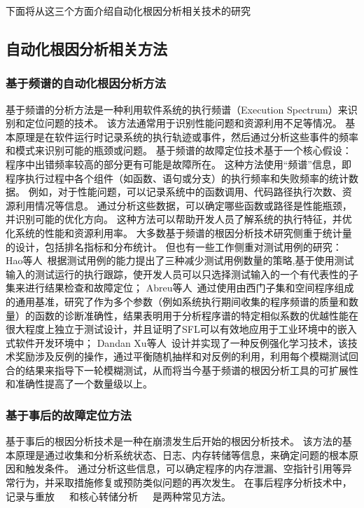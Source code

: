 下面将从这三个方面介绍自动化根因分析相关技术的研究
\subsection{自动化根因分析相关方法}
\subsubsection{基于频谱的自动化根因分析方法}
基于频谱的分析方法是一种利用软件系统的执行频谱（Execution Spectrum）来识别和定位问题的技术。
该方法通常用于识别性能问题和资源利用不足等情况。
基本原理是在软件运行时记录系统的执行轨迹或事件，然后通过分析这些事件的频率和模式来识别可能的瓶颈或问题。
基于频谱的故障定位技术基于一个核心假设：程序中出错频率较高的部分更有可能是故障所在。
这种方法使用“频谱”信息，即程序执行过程中各个组件（如函数、语句或分支）的执行频率和失败频率的统计数据。
例如，对于性能问题，可以记录系统中的函数调用、代码路径执行次数、资源利用情况等信息。
通过分析这些数据，可以确定哪些函数或路径是性能瓶颈，并识别可能的优化方向。
这种方法可以帮助开发人员了解系统的执行特征，并优化系统的性能和资源利用率。
大多数基于频谱的根因分析技术研究侧重于统计量的设计，包括排名指标和分布统计。
但也有一些工作侧重对测试用例的研究：
Hao等人~\cite{Test2010}根据测试用例的能力提出了三种减少测试用例数量的策略,基于使用测试输入的测试运行的执行跟踪，使开发人员可以只选择测试输入的一个有代表性的子集来进行结果检查和故障定位；
Abreu等人~\cite{practical2009}通过使用由西门子集和空间程序组成的通用基准，研究了作为多个参数（例如系统执行期间收集的程序频谱的质量和数量）的函数的诊断准确性，结果表明用于分析程序谱的特定相似系数的优越性能在很大程度上独立于测试设计，并且证明了SFL可以有效地应用于工业环境中的嵌入式软件开发环境中；
Dandan Xu等人~\cite{Racing}设计并实现了一种反例强化学习技术，该技术奖励涉及反例的操作，通过平衡随机抽样和对反例的利用，利用每个模糊测试回合的结果来指导下一轮模糊测试，从而将当今基于频谱的根因分析工具的可扩展性和准确性提高了一个数量级以上。

\subsubsection{基于事后的故障定位方法}
基于事后的根因分析技术是一种在崩溃发生后开始的根因分析技术。
该方法的基本原理是通过收集和分析系统状态、日志、内存转储等信息，来确定问题的根本原因和触发条件。
通过分析这些信息，可以确定程序的内存泄漏、空指针引用等异常行为，并采取措施修复或预防类似问题的再次发生。
在事后程序分析技术中，记录与重放~\cite{ReCrash2008}~\cite{SymCrash2014}~\cite{Chronicler2013}和核心转储分析~\cite{RETracer2016}~\cite{Making2015}~\cite{CREDAL2016}是两种常见方法。

